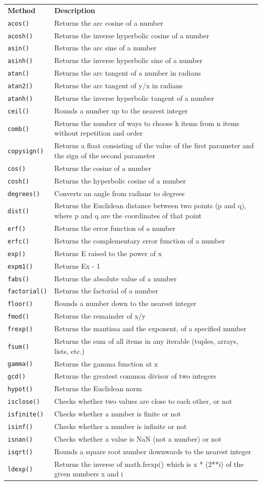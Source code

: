 \documentclass[12pt,a4paper]{article}
\newcommand{\lcode}[1]{%
	\lstinline{#1}%
}
\newcommand{\tcol}[2]{%
	\quad #1 & #2 \\
}
\begin{document}
\begin{center}
	\begin{longtable}{p{} p{}}
\tcol{\textbf{Method}}{\textbf{Description}}
\tcol{\lcode{acos()}}{Returns the arc cosine of a number}
\tcol{\lcode{acosh()}}{Returns the inverse hyperbolic cosine of a number}
\tcol{\lcode{asin()}}{Returns the arc sine of a number}
\tcol{\lcode{asinh()}}{Returns the inverse hyperbolic sine of a number}
\tcol{\lcode{atan()}}{Returns the arc tangent of a number in radians}
\tcol{\lcode{atan2()}}{Returns the arc tangent of y/x in radians}
\tcol{\lcode{atanh()}}{Returns the inverse hyperbolic tangent of a number}
\tcol{\lcode{ceil()}}{Rounds a number up to the nearest integer}
\tcol{\lcode{comb()}}{Returns the number of ways to choose k items from n items
		without repetition and order}
\tcol{\lcode{copysign()}}{Returns a float consisting of the value of the first
		parameter and the sign of the second parameter}
\tcol{\lcode{cos()}}{Returns the cosine of a number}
\tcol{\lcode{cosh()}}{Returns the hyperbolic cosine of a number}
\tcol{\lcode{degrees()}}{Converts an angle from radians to degrees}
\tcol{\lcode{dist()}}{Returns the Euclidean distance between two points (p and
		q), where p and q are the coordinates of that point}
\tcol{\lcode{erf()}}{Returns the error function of a number}
\tcol{\lcode{erfc()}}{Returns the complementary error function of a number}
\tcol{\lcode{exp()}}{Returns E raised to the power of x}
\tcol{\lcode{expm1()}}{Returns Ex - 1}
\tcol{\lcode{fabs()}}{Returns the absolute value of a number}
\tcol{\lcode{factorial()}}{Returns the factorial of a number}
\tcol{\lcode{floor()}}{Rounds a number down to the nearest integer}
\tcol{\lcode{fmod()}}{Returns the remainder of x/y}
\tcol{\lcode{frexp()}}{Returns the mantissa and the exponent, of a specified number}
\tcol{\lcode{fsum()}}{Returns the sum of all items in any iterable (tuples,
		arrays, lists, etc.)}
\tcol{\lcode{gamma()}}{Returns the gamma function at x}
\tcol{\lcode{gcd()}}{Returns the greatest common divisor of two integers}
\tcol{\lcode{hypot()}}{Returns the Euclidean norm}
\tcol{\lcode{isclose()}}{Checks whether two values are close to each other, or not}
\tcol{\lcode{isfinite()}}{Checks whether a number is finite or not}
\tcol{\lcode{isinf()}}{Checks whether a number is infinite or not}
\tcol{\lcode{isnan()}}{Checks whether a value is NaN (not a number) or not}
\tcol{\lcode{isqrt()}}{Rounds a square root number downwards to the nearest integer}
\tcol{\lcode{ldexp()}}{Returns the inverse of math.frexp() which is x * (2**i)
		of the given numbers x and i}

\end{longtable}
\end{center}
\end{document}
